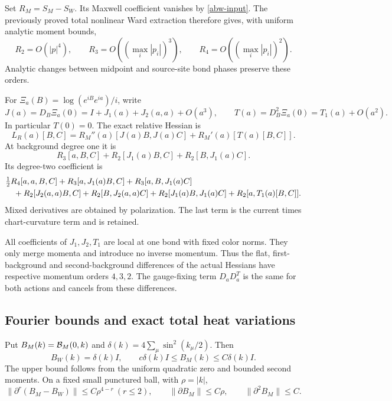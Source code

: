 \documentclass[11pt]{article}
\theoremstyle{remark}
\begin{document}
Set \(R_M=S_M-S_W\). Its Maxwell coefficient vanishes by
\eqref{abw-input}. The previously proved total nonlinear Ward extraction
therefore gives, with uniform analytic moment bounds,
\begin{equation}
 R_2=O(|p|^4),\qquad R_3=O((\max_i|p_i|)^3),\qquad
 R_4=O((\max_i|p_i|)^2).
 \label{abw-ward-orders}
\end{equation}
Analytic changes between midpoint and source-site bond phases preserve
these orders.

For \(\Xi_a(B)=\log(e^{iB}e^{ia})/i\), write
\[
 J(a)=D_B\Xi_a(0)=I+J_1(a)+J_2(a,a)+O(a^3),\qquad
 T(a)=D_B^2\Xi_a(0)=T_1(a)+O(a^2).
\]
In particular \(T(0)=0\). The exact relative Hessian is
\begin{equation}
 L_R(a)[B,C]=R_M''(a)[J(a)B,J(a)C]
                  +R_M'(a)[T(a)[B,C]].
 \label{abw-chain}
\end{equation}
At background degree one it is
\[
 R_3[a,B,C]+R_2[J_1(a)B,C]+R_2[B,J_1(a)C].
\]
Its degree-two coefficient is
\begin{align}
 &\tfrac12R_4[a,a,B,C]
 +R_3[a,J_1(a)B,C]+R_3[a,B,J_1(a)C]\notag\\
 &\quad+R_2[J_2(a,a)B,C]+R_2[B,J_2(a,a)C]
 +R_2[J_1(a)B,J_1(a)C]+R_2[a,T_1(a)[B,C]].
 \label{abw-second-chart}
\end{align}
Mixed derivatives are obtained by polarization. The last term is the
current times chart-curvature term and is retained.

All coefficients of \(J_1,J_2,T_1\) are local at one bond with fixed color
norms. They only merge momenta and introduce no inverse momentum.
Thus the flat, first-background and second-background differences of the
actual Hessians have respective momentum orders \(4,3,2\).
The gauge-fixing term \(D_aD_a^T\) is the same for both actions and
cancels from these differences.

\subsection{Fourier bounds and exact total heat variations}
\label{abw-diagram-section}

Put \(B_M(k)={\cal B}_M(0,k)\) and
\(\delta(k)=4\sum_\mu\sin^2(k_\mu/2)\). Then
\begin{equation}
 B_W(k)=\delta(k)I,\qquad
 c\delta(k)I\le B_M(k)\le C\delta(k)I.
 \label{abw-ellipticity}
\end{equation}
The upper bound follows from the uniform quadratic zero and bounded
second moments. On a fixed small punctured ball, with \(\rho=|k|\),
\begin{equation}
 \|\partial^r(B_M-B_W)\|\le C\rho^{4-r}\ (r\le2),\qquad
 \|\partial B_M\|\le C\rho,\qquad \|\partial^2B_M\|\le C.
 \label{abw-flat-jets}
\end{equation}
\end{document}
